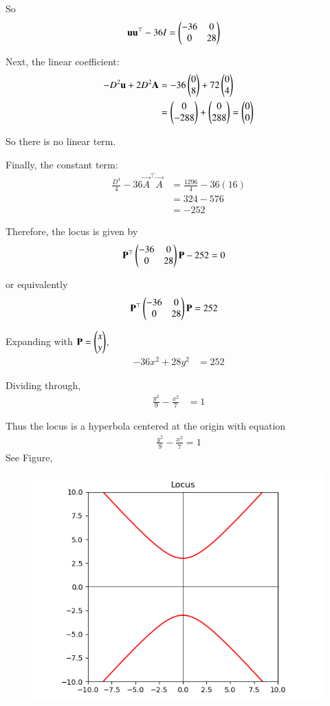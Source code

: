 \documentclass[journal]{IEEEtran}
\begin{document}
So
\begin{align}
    \mathbf{u}\mathbf{u}^\top - 36I &= \begin{pmatrix}-36 & 0 \\ 0 & 28\end{pmatrix}
\end{align}

Next, the linear coefficient:
\begin{align}
    -D^2\mathbf{u} + 2D^2\mathbf{A}
    &= -36\begin{pmatrix}0\\8\end{pmatrix} + 72\begin{pmatrix}0\\4\end{pmatrix} \\
    &= \begin{pmatrix}0\\-288\end{pmatrix} + \begin{pmatrix}0\\288\end{pmatrix} = \begin{pmatrix}0\\0\end{pmatrix}
\end{align}

So there is no linear term.

Finally, the constant term:
\begin{align}
    \frac{D^4}{4} - 36\vec{A}^\top\vec{A}
    &= \frac{1296}{4} - 36(16) \\
    &= 324 - 576 \\
    &= -252
\end{align}

Therefore, the locus is given by
\begin{align}
    \mathbf{P}^\top\begin{pmatrix}-36 & 0 \\ 0 & 28\end{pmatrix}\mathbf{P} - 252 &= 0
\end{align}

or equivalently
\begin{align}
    \mathbf{P}^\top\begin{pmatrix}-36 & 0 \\ 0 & 28\end{pmatrix}\mathbf{P} &= 252
\end{align}

Expanding with $\mathbf{P}=\begin{pmatrix}x\\y\end{pmatrix}$,
\begin{align}
    -36x^2 + 28y^2 &= 252
\end{align}

Dividing through,
\begin{align}
    \frac{y^2}{9} - \frac{x^2}{7} &= 1
\end{align}

Thus the locus is a hyperbola centered at the origin with equation
\begin{align}
    \frac{y^2}{9} - \frac{x^2}{7} = 1
\end{align}
See Figure,
\begin{figure}[h!]
    \centering
    \includegraphics[height=0.5\textheight, keepaspectratio]{figs/fig.png}
    \label{figure_1}
\end{figure}
\end{document}
